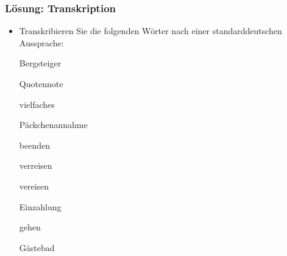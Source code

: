 
\begin{frame}
\frametitle{Lösung: Transkription}

\begin{itemize}

\item Transkribieren Sie die folgenden Wörter nach einer standarddeutschen Aussprache:

\ea 
\settowidth{}

		\ea Bergsteiger
		
		\ex Quotennote
		
		\ex vielfaches
		
		\ex Päckchenannahme
		
		\ex beenden
		
		\ex verreisen
		
		\ex vereisen
		
		\ex Einzahlung
		
		\ex gehen
		
		\ex Gästebad
		
		\z 
\z		

\end{itemize}

\end{frame}

